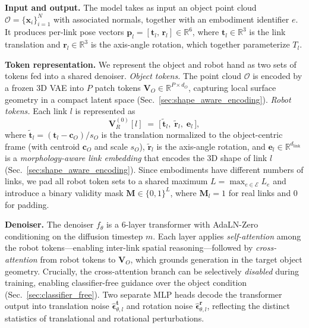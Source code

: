 \noindent\textbf{Input and output.}
The model takes as input an object point cloud $\mathcal{O} = \{\mathbf{x}_i\}_{i=1}^{N}$ with associated normals, together with an embodiment identifier $e$.
It produces per-link pose vectors $\mathbf{p}_l = [\mathbf{t}_l,\, \mathbf{r}_l] \in \mathbb{R}^6$, where $\mathbf{t}_l \in \mathbb{R}^3$ is the link translation and $\mathbf{r}_l \in \mathbb{R}^3$ is the axis-angle rotation, which together parameterize $T_l$.

\noindent\textbf{Token representation.}
We represent the object and robot hand as two sets of tokens fed into a shared denoiser.
%
\emph{Object tokens.}
The point cloud $\mathcal{O}$ is encoded by a frozen 3D VAE into $P$ patch tokens $\mathbf{V}_O \in \mathbb{R}^{P \times d_O}$, capturing local surface geometry in a compact latent space (Sec.~\ref{sec:shape_aware_encoding}).
%
\emph{Robot tokens.}
Each link $l$ is represented as
\begin{equation}
  \mathbf{V}_R^{(0)}[l] \;=\; \bigl[\,\tilde{\mathbf{t}}_l,\; \tilde{\mathbf{r}}_l,\; \mathbf{e}_l\,\bigr],
  \label{eq:robot_token}
\end{equation}
where $\tilde{\mathbf{t}}_l = (\mathbf{t}_l - \mathbf{c}_O)/s_O$ is the translation normalized to the object-centric frame (with centroid $\mathbf{c}_O$ and scale $s_O$), $\tilde{\mathbf{r}}_l$ is the axis-angle rotation, and $\mathbf{e}_l \in \mathbb{R}^{d_\text{link}}$ is a \emph{morphology-aware link embedding} that encodes the 3D shape of link $l$ (Sec.~\ref{sec:shape_aware_encoding}).
Since embodiments have different numbers of links, we pad all robot token sets to a shared maximum $L = \max_{e \in \mathcal{E}} L_e$ and introduce a binary validity mask $\mathbf{M} \in \{0,1\}^{L}$, where $\mathbf{M}_l = 1$ for real links and $0$ for padding.

\noindent\textbf{Denoiser.}
The denoiser $f_\theta$ is a 6-layer transformer with AdaLN-Zero~\cite{peebles2023scalable} conditioning on the diffusion timestep $m$.
Each layer applies \emph{self-attention} among the robot tokens---enabling inter-link spatial reasoning---followed by \emph{cross-attention} from robot tokens to $\mathbf{V}_O$, which grounds generation in the target object geometry.
Crucially, the cross-attention branch can be selectively \emph{disabled} during training, enabling classifier-free guidance over the object condition (Sec.~\ref{sec:classifier_free}).
Two separate MLP heads decode the transformer output into translation noise $\hat{\boldsymbol{\epsilon}}_{\theta,l}^{\mathbf{t}}$ and rotation noise $\hat{\boldsymbol{\epsilon}}_{\theta,l}^{\mathbf{r}}$, reflecting the distinct statistics of translational and rotational perturbations.

